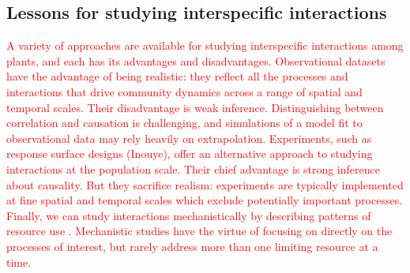 \documentclass[11pt]{article}
\newcommand{\new}{\textcolor{red}}
\begin{document}
\begin{doublespacing}

\subsection*{Lessons for studying interspecific interactions}

\new{A variety of approaches are available for studying interspecific interactions among plants, and each has its advantages and disadvantages. Observational datasets have the advantage of being realistic: they reflect all the processes and interactions that drive community dynamics across a range of spatial and temporal scales. Their disadvantage is weak inference. Distinguishing between correlation and causation is challenging, and simulations of a model fit to observational data may rely heavily on extrapolation. Experiments, such as response surface designs (Inouye), offer an alternative approach to studying interactions at the population scale. Their chief advantage is strong inference about causality. But they sacrifice realism: experiments are typically implemented at fine spatial and temporal scales which exclude potentially important processes.  Finally, we can study interactions mechanistically by describing patterns of resource use \citep{Dybzinski2007,Silvertown1999}. Mechanistic studies have the virtue of focusing on directly on the processes of interest, but rarely address more than one limiting resource at a time. }


\end{doublespacing}
\end{document}
